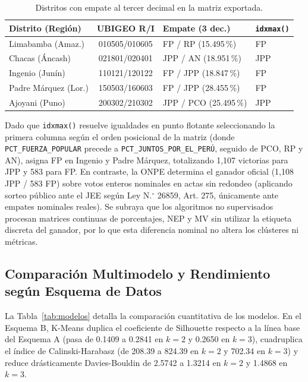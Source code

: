 \documentclass[conference,10pt,letterpaper]{IEEEtran}
\begin{document}
\begin{table}[htbp]
\centering
\caption{Distritos con empate al tercer decimal en la matriz exportada.}
\label{tab:empates}
\scriptsize
\begin{tabularx}{\columnwidth}{@{} l c l l @{}}
\toprule
\textbf{Distrito (Región)} & \textbf{UBIGEO R/I} & \textbf{Empate (3 dec.)} & \textbf{\texttt{idxmax()}} \\
\midrule
Limabamba (Amaz.) & 010505/010605 & FP / RP (15.495\,\%) & FP \\
Chacas (Áncash) & 021801/020401 & JPP / AN (18.951\,\%) & JPP \\
Ingenio (Junín) & 110121/120122 & FP / JPP (18.847\,\%) & FP \\
Padre Márquez (Lor.) & 150503/160603 & FP / JPP (28.455\,\%) & FP \\
Ajoyani (Puno) & 200302/210302 & JPP / PCO (25.495\,\%) & JPP \\
\bottomrule
\end{tabularx}
\end{table}

Dado que \texttt{idxmax()} resuelve igualdades en punto flotante seleccionando la primera columna según el orden posicional de la matriz (donde \texttt{PCT\_FUERZA\_POPULAR} precede a \texttt{PCT\_JUNTOS\_POR\_EL\_PERÚ}, seguido de PCO, RP y AN), asigna FP en Ingenio y Padre Márquez, totalizando 1,107 victorias para JPP y 583 para FP. En contraste, la ONPE determina el ganador oficial (1,108 JPP / 583 FP) sobre votos enteros nominales en actas sin redondeo (aplicando sorteo público ante el JEE según Ley N.$^\circ$ 26859, Art. 275, únicamente ante empates nominales reales). Se subraya que los algoritmos no supervisados procesan matrices continuas de porcentajes, NEP y MV sin utilizar la etiqueta discreta del ganador, por lo que esta diferencia nominal no altera los clústeres ni métricas.

\subsection{Comparación Multimodelo y Rendimiento según Esquema de Datos}

La Tabla~\ref{tab:modelos} detalla la comparación cuantitativa de los modelos. En el Esquema B, K-Means duplica el coeficiente de Silhouette respecto a la línea base del Esquema A (pasa de 0.1409 a 0.2841 en $k = 2$ y 0.2650 en $k = 3$), cuadruplica el índice de Calinski-Harabasz (de 208.39 a 824.39 en $k = 2$ y 702.34 en $k = 3$) y reduce drásticamente Davies-Bouldin de 2.5742 a 1.3214 en $k = 2$ y 1.4868 en $k = 3$.
\end{document}
